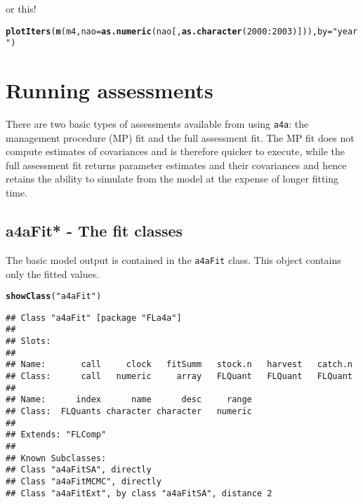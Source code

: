 \documentclass[a4paper,english,10pt]{article}\usepackage[]{graphicx}\usepackage[]{color}
\makeatletter
\newcommand{\hlnum}[1]{\textcolor[rgb]{0.686,0.059,0.569}{#1}}%
\newcommand{\hlstr}[1]{\textcolor[rgb]{0.192,0.494,0.8}{#1}}%
\newcommand{\hlopt}[1]{\textcolor[rgb]{0,0,0}{#1}}%
\newcommand{\hlstd}[1]{\textcolor[rgb]{0.345,0.345,0.345}{#1}}%
\newcommand{\hlkwc}[1]{\textcolor[rgb]{0.333,0.667,0.333}{#1}}%
\newcommand{\hlkwd}[1]{\textcolor[rgb]{0.737,0.353,0.396}{\textbf{#1}}}%
\newenvironment{kframe}{%
 \def\at@end@of@kframe{}%
 \ifinner\ifhmode%
  \def\at@end@of@kframe{\end{minipage}}%
  \begin{minipage}{\columnwidth}%
 \fi\fi%
 \def\FrameCommand##1{\hskip\@totalleftmargin \hskip-\fboxsep
 \colorbox{shadecolor}{##1}\hskip-\fboxsep
     \hskip-\linewidth \hskip-\@totalleftmargin \hskip\columnwidth}%
 \MakeFramed {\advance\hsize-\width
   \@totalleftmargin\z@ \linewidth\hsize
   \@setminipage}}%
 {\par\unskip\endMakeFramed%
 \at@end@of@kframe}
\newenvironment{knitrout}{}{} %
\makeatother
\begin{document}
or this!
\begin{knitrout}
\color{fgcolor}\begin{kframe}
\begin{alltt}
\hlkwd{plotIters}\hlstd{(}\hlkwd{m}\hlstd{(m4,} \hlkwc{nao} \hlstd{=} \hlkwd{as.numeric}\hlstd{(nao[,} \hlkwd{as.character}\hlstd{(}\hlnum{2000}\hlopt{:}\hlnum{2003}\hlstd{)])),} \hlkwc{by} \hlstd{=} \hlstr{"year"}\hlstd{)}
\end{alltt}


{\ttfamily\noindent\bfseries\color{errorcolor}{\#\# Error: object 'nao' not found}}\end{kframe}
\end{knitrout}



\section{Running assessments}

There are two basic types of assessments available from using \texttt{a4a}: the management procedure (MP) fit and the full assessment fit.  The MP fit does not compute estimates of covariances and is therefore quicker to execute, while the full assessment fit returns parameter estimates and their covariances and hence retains the ability to simulate from the model at the expense of longer fitting time.


\subsection{a4aFit* - The fit classes}

The basic model output is contained in the \texttt{a4aFit} class.  This object contains only the fitted values.

\begin{knitrout}
\color{fgcolor}\begin{kframe}
\begin{alltt}
\hlkwd{showClass}\hlstd{(}\hlstr{"a4aFit"}\hlstd{)}
\end{alltt}
\begin{verbatim}
## Class "a4aFit" [package "FLa4a"]
## 
## Slots:
##                                                                   
## Name:       call     clock   fitSumm   stock.n   harvest   catch.n
## Class:      call   numeric     array   FLQuant   FLQuant   FLQuant
##                                               
## Name:      index      name      desc     range
## Class:  FLQuants character character   numeric
## 
## Extends: "FLComp"
## 
## Known Subclasses: 
## Class "a4aFitSA", directly
## Class "a4aFitMCMC", directly
## Class "a4aFitExt", by class "a4aFitSA", distance 2
\end{verbatim}
\end{kframe}
\end{knitrout}
\end{document}
